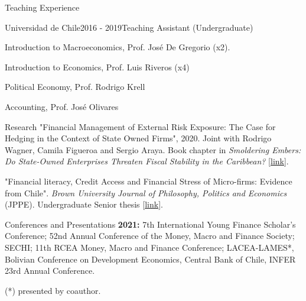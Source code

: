 \documentclass{resume_style} %
\begin{document}
\begin{rSection}{Teaching Experience } 

\begin{rSubsection}{Universidad de Chile}{2016 - 2019}{Teaching Assistant (Undergraduate)}{}
\item Introduction to Macroeconomics, Prof. Jos\'e De Gregorio (x2).
\item Introduction to Economics, Prof. Luis Riveros (x4)
\item Political Economy, Prof. Rodrigo Krell
\item Accounting, Prof. Jos\'e Olivares 
\end{rSubsection}
\end{rSection}

\begin{rSection}{Research}
"Financial Management of External Risk Exposure: The Case for Hedging in the Context of State Owned Firms", 2020. Joint with Rodrigo Wagner, Camila Figueroa and Sergio Araya. {Book chapter in \it Smoldering Embers: Do State-Owned Enterprises Threaten Fiscal Stability in the Caribbean?} [\href{https://publications.iadb.org/en/smoldering-embers-do-state-owned-enterprises-threaten-fiscal-stability-caribbean}{link}]. 

"Financial literacy, Credit Access and Financial Stress of Micro-firms: Evidence from Chile". \textit{Brown University Journal of Philosophy, Politics and Economics} (JPPE). Undergraduate Senior thesis [\href{https://www.brownjppe.com/}{link}].
\end{rSection}





\begin{rSection}{Conferences and Presentations}
\textbf{2021:}
7th International Young Finance Scholar's Conference; 52nd Annual Conference of the Money, Macro and Finance Society; SECHI; 11th RCEA Money, Macro and Finance Conference; LACEA-LAMES*, Bolivian Conference on Development Economics, Central Bank of Chile, INFER 23rd Annual Conference.
 
(*) presented by coauthor.

\end{rSection}
\end{document}
